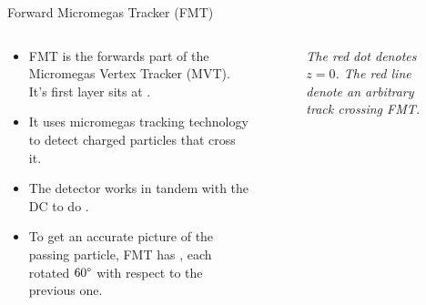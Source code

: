 \begin{frame}{Forward Micromegas Tracker (FMT)}
    \label{10.24::fmt}

    \begin{columns}[onlytextwidth,T]

    \begin{column}{.48\linewidth}
        \vspace{6pt}
        \begin{itemize}
            \item
                FMT is the forwards part of the Micromegas Vertex Tracker (MVT).
                It's first layer sits at .

            \vspace{6pt}
            \item
                It uses micromegas tracking technology to detect charged particles that cross it.

            \vspace{6pt}
            \item
                The detector works in tandem with the DC to do .

            \vspace{6pt}
            \item
                To get an accurate picture of the passing particle, FMT has , each rotated $60\degree$ with respect to the previous one.

        \end{itemize}
    \end{column}

    \begin{column}{.50\linewidth}
        \begin{center}
            \begin{figure}[t]

                \scriptsize{\textit{
                    The red dot denotes $z=0$.
                    The red line denote an arbitrary track crossing FMT.
                }}
            \end{figure}
        \end{center}
    \end{column}

    \end{columns}
\end{frame}
